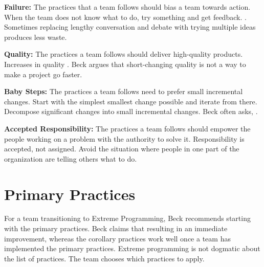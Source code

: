 
\textbf{Failure:} The practices that a team follows should bias a team towards action. When the team does not know what to do, try something and get feedback.  \cite{BeckExtremeProgramming2004}. Sometimes replacing lengthy conversation and debate with trying multiple ideas produces less waste.

\textbf{Quality:} The practices a team follows should deliver high-quality products. Increases in quality  \cite{BeckExtremeProgramming2004}. Beck argues that short-changing quality is not a way to make a project go faster. 

\textbf{Baby Steps:} The practices a team follows need to prefer small incremental changes. Start with the simplest smallest change possible and iterate from there. Decompose significant changes into small incremental changes. Beck often asks,  \cite{BeckExtremeProgramming2004}. 

\textbf{Accepted Responsibility:} The practices a team follows should empower the people working on a problem with the authority to solve it. Responsibility is accepted, not assigned. Avoid the situation where people in one part of the organization are telling others what to do. 

\section{Primary Practices}
For a team transitioning to Extreme Programming, Beck recommends starting with the primary practices. Beck claims that  resulting in an immediate improvement, whereas the corollary practices work well once a team has implemented the primary practices. Extreme programming is not dogmatic about the list of practices. The team chooses which practices to apply.

